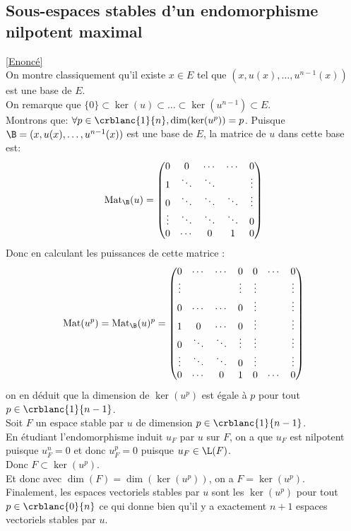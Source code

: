\documentclass[8pt]{book}
\begin{document}
	\subsection{Sous-espaces stables d'un endomorphisme nilpotent maximal }
	\label{Sous-espaces stables d'un endomorphisme nilpotent maximal corrigé}
	\textcolor{blue}{\hyperref[Sous-espaces stables d'un endomorphsime nilpotent maximal]{[Enoncé]}}\\
	On montre classiquement qu'il existe $x\in E$ tel que $(x,u(x),\dots,u^{n-1}(x))$ est une base de $E$.
	\\On remarque que $\{0\}\subset \ker(u)\subset\dots\subset\ker(u^{n-1})\subset E$.
	\\Montrons que: $\forall p\in\crblanc{1}{n}, \dim(\ker(u^p))=p$.
	Puisque $\B=(x,u(x),\dots,u^{n-1}(x))$ est une base de $E$, la matrice de $u$ dans cette base est: $$\operatorname{Mat}_\B(u)=\begin{pmatrix}
		0 &0 &\cdots &\cdots &0\\
		1 & \ddots & \ddots &&\vdots\\
		0 &\ddots & \ddots &\ddots&\vdots\\
		\vdots &\ddots&\ddots&\ddots&0\\
		0 &\cdots&0&1&0
	\end{pmatrix}$$
	Donc en calculant les puissances de cette matrice :
	$$\operatorname{Mat}(u^p)=\operatorname{Mat}_\B(u)^p=\begin{pmatrix}
		0 &\cdots &\cdots &0 &0 &\cdots&0\\
		\vdots & & &\vdots &\vdots & & \vdots\\
		0 &\cdots &\cdots &0 &\vdots & &\vdots\\
		1 &0 &\cdots &0 &\vdots & &\vdots\\
		0 &\ddots &\ddots &\vdots &\vdots & &\vdots\\
		\vdots &\ddots&\ddots&0 &\vdots & &\vdots\\
		0 &\cdots&0&1&0&\cdots&0
	\end{pmatrix}$$
	on en déduit que la dimension de $\ker(u^p)$ est égale à $p$ pour tout $p\in\crblanc{1}{n-1}$.
	\\Soit $F$ un espace stable par $u$ de dimension $p\in\crblanc{1}{n-1}$.
	\\En étudiant l'endomorphisme induit $u_F$ par $u$ sur $F$, on a que $u_F$ est nilpotent puisque $u_F^n=0$ et donc $u_F^p=0$ puisque $u_F\in \L(F)$.
	\\Donc $F\subset \ker(u^p)$.
	\\Et donc avec $\dim(F)=\dim(\ker(u^p))$, on a $F=\ker(u^p)$.
	\\Finalement, les espaces vectoriels stables par $u$ sont les $\ker(u^p)$ pour tout $p\in\crblanc{0}{n}$ ce qui donne bien qu'il y a exactement $n+1$ espaces vectoriels stables par $u$.
	
\end{document}
